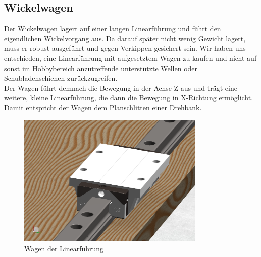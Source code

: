 \documentclass[paper=A4,pagesize,DIV=18, 12pt,listof=totoc,bibliography=totoc,headings=optiontohead,open=any]{article}
\begin{document}
\subsection{Wickelwagen}
Der Wickelwagen lagert auf einer langen Linearführung und führt den eigendlichen Wickelvorgang aus. Da darauf später nicht wenig Gewicht lagert, muss er robust ausgeführt und gegen Verkippen gesichert sein. Wir haben uns entschieden, eine Linearführung mit aufgesetztem Wagen zu kaufen und nicht auf sonst im Hobbybereich anzutreffende unterstützte Wellen oder Schubladenschienen zurückzugreifen.\\
Der Wagen führt demnach die Bewegung in der Achse Z aus und trägt eine weitere, kleine Linearführung, die dann die Bewegung in X-Richtung ermöglicht. Damit entspricht der Wagen dem Planschlitten einer Drehbank.
\begin{figure}[H]
	\centering
	\includegraphics[width=0.8\textwidth]{NX_Screenshots/wagen.png}
	\caption{Wagen der Linearführung} 
	\label{fig:wagen}
\end{figure}
\end{document}
